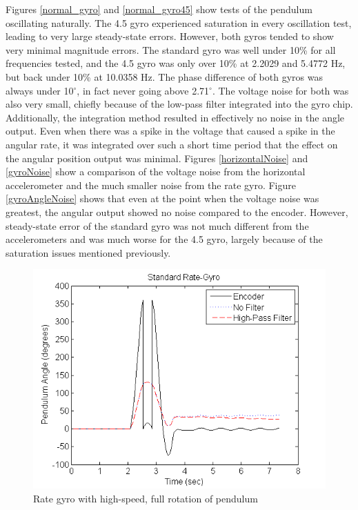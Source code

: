 \documentclass{article}
\theoremstyle{plain}
\theoremstyle{definition}
\theoremstyle{remark}
\begin{document}
Figures \ref{normal_gyro} and \ref{normal_gyro45} show tests of the pendulum oscillating naturally. The 4.5 gyro experienced saturation in every oscillation test, leading to very large steady-state errors. However, both gyros tended to show very minimal magnitude errors. The standard gyro was well under 10\% for all frequencies tested, and the 4.5 gyro was only over 10\% at 2.2029 and 5.4772 Hz, but back under 10\% at 10.0358 Hz. The phase difference of both gyros was always under 10$^{\circ}$, in fact never going above 2.71$^{\circ}$. The voltage noise for both was also very small, chiefly because of the low-pass filter integrated into the gyro chip. Additionally, the integration method resulted in effectively no noise in the angle output. Even when there was a spike in the voltage that caused a spike in the angular rate, it was integrated over such a short time period that the effect on the angular position output was minimal. Figures \ref{horizontalNoise} and \ref{gyroNoise} show a comparison of the voltage noise from the horizontal accelerometer and the much smaller noise from the rate gyro. Figure \ref{gyroAngleNoise} shows that even at the point when the voltage noise was greatest, the angular output showed no noise compared to the encoder. However,  steady-state error of the standard gyro was not much different from the accelerometers and was much worse for the 4.5 gyro, largely because of the saturation issues mentioned previously.\\ 

\begin{figure}[hbt]
\begin{center}
\includegraphics[width = 12cm]{FullRotation_Gyro.png}
\caption{Rate gyro with high-speed, full rotation of pendulum}
\label{full_gyro}
\end{center}
\end{figure}
\end{document}
